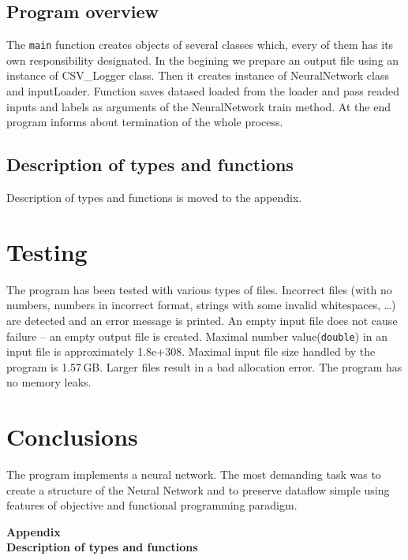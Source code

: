 \documentclass[12pt,a4paper,twoside]{article}
\let\oldmarginpar\marginpar
\renewcommand\marginpar[1]{%
  {\linespread{0.85}\normalfont\scriptsize%
\oldmarginpar[\hspace{1cm}\begin{minipage}{3cm}\raggedleft\scriptsize\color{black}\textsf{#1}\end{minipage}]%
{\hspace{0cm}\begin{minipage}{3cm}\raggedright\scriptsize\color{black}\textsf{#1}\end{minipage}}%
}%
}
\begin{document}
\subsection{Program overview}
The \lstinline|main| function creates objects of several classes which, every of them has its own responsibility designated. In the begining we prepare an output file using an instance of CSV_Logger class. Then it creates instance of NeuralNetwork class and inputLoader. Function saves datased loaded from the loader and pass readed inputs and labels as arguments of the NeuralNetwork train method. At the end program informs about termination of the whole process.

\subsection{Description of types and functions}
Description of types and functions is moved to the appendix.



\section{Testing}
The program has been tested with various types of files. Incorrect files (with no numbers, numbers in incorrect format, strings with some invalid whitespaces, \ldots) are detected and an error message is printed. An empty input file does not cause failure – an empty output file is created. Maximal number value(\lstinline!double!) in an input file is approximately 1.8e+308. Maximal input file size handled by the program is \mbox{1.57$\,$GB}. Larger files result in a bad allocation error. The program has no memory leaks.



\section{Conclusions}

The program implements a neural network. The most demanding task was to create a structure of the Neural Network and to preserve dataflow simple using features of objective and functional programming paradigm.







\cleardoublepage

\rule{0cm}{0cm}

\vfill

\begin{center}
   \Huge\bfseries Appendix\\Description of types and functions\par
\end{center}

\vfill

\rule{0cm}{0cm}
\end{document}
